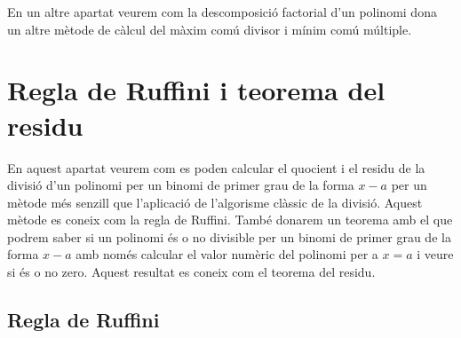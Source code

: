 En un altre apartat veurem com la descomposició factorial d'un
polinomi dona un altre mètode de càlcul del màxim comú divisor
i mínim comú múltiple.

\section{Regla de Ruffini i teorema del residu}

En aquest apartat veurem com es poden calcular el quocient i el residu de
la divisió d'un polinomi per un binomi de primer grau de la forma $x-a$ per un mètode més senzill que l'aplicació de l'algorisme
clàssic de la divisió. Aquest mètode es coneix com la regla de
Ruffini. També donarem un teorema amb el que podrem saber si un
polinomi és o no divisible per un binomi de primer grau de la forma $x-a$
amb només calcular el valor numèric del polinomi per a $x=a$ i
veure si és o no zero. Aquest resultat es coneix com el teorema del residu.

\subsection{Regla de Ruffini}

